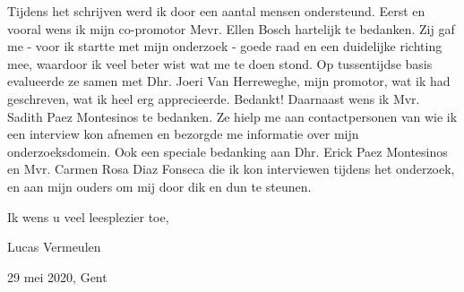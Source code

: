 Tijdens het schrijven werd ik door een aantal mensen ondersteund. Eerst en vooral wens ik mijn co-promotor Mevr. Ellen Bosch hartelijk te bedanken. Zij gaf me - voor ik startte met mijn onderzoek - goede raad en een duidelijke richting mee, waardoor ik veel beter wist wat me te doen stond. Op tussentijdse basis evalueerde ze samen met Dhr. Joeri Van Herreweghe, mijn promotor, wat ik had geschreven, wat ik heel erg apprecieerde. Bedankt! Daarnaast wens ik Mvr. Sadith Paez Montesinos te bedanken. Ze hielp me aan contactpersonen van wie ik een interview kon afnemen en bezorgde me informatie over mijn onderzoeksdomein. Ook een speciale bedanking aan Dhr. Erick Paez Montesinos en Mvr. Carmen Rosa Diaz Fonseca die ik kon interviewen tijdens het onderzoek, en aan mijn ouders om mij door dik en dun te steunen.

Ik wens u veel leesplezier toe,

Lucas Vermeulen

29 mei 2020, Gent